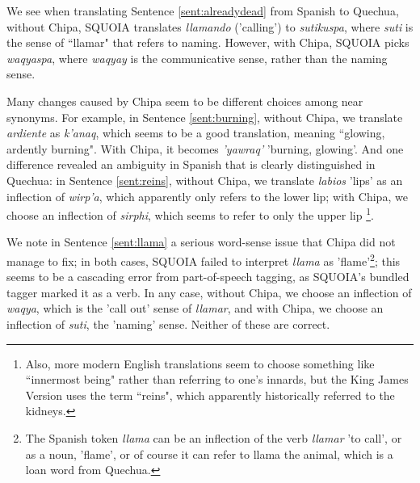 We see when translating Sentence \ref{sent:alreadydead}  from Spanish to
Quechua, without Chipa, SQUOIA translates \emph{llamando} ('calling') to
\emph{sutikuspa}, where \emph{suti} is the sense of ``llamar" that refers to
naming. However, with Chipa, SQUOIA picks \emph{waqyaspa}, where \emph{waqyay}
is the communicative sense, rather than the naming sense.

Many changes caused by Chipa seem to be different choices among near synonyms.
For example, in Sentence \ref{sent:burning}, without Chipa, we translate
\emph{ardiente} as \emph{k'anaq}, which seems to be a good translation, meaning
``glowing, ardently burning". With Chipa, it becomes \emph{'yawraq'} 'burning,
glowing'. And one difference revealed an ambiguity in Spanish that is clearly
distinguished in Quechua: in Sentence \ref{sent:reins}, without Chipa, we
translate \emph{labios} 'lips' as an inflection of \emph{wirp'a}, which
apparently only refers to the lower lip; with Chipa, we choose an inflection of
\emph{sirphi}, which seems to refer to only the upper lip
\footnote{Also, more modern English translations seem to choose something like
``innermost being" rather than referring to one's innards, but the King James
Version uses the term ``reins", which apparently historically referred to the
kidneys.}.

We note in Sentence \ref{sent:llama} a serious word-sense issue that Chipa did
not manage to fix; in both cases, SQUOIA failed to interpret \emph{llama} as
'flame'\footnote{The Spanish token \emph{llama} can be an inflection of the
verb \emph{llamar} 'to call', or as a noun, 'flame', or of course it can refer
to llama the animal, which is a loan word from Quechua.}; this seems to be a
cascading error from part-of-speech tagging, as SQUOIA's bundled tagger marked
it as a verb. In any case, without Chipa, we choose an inflection of
\emph{waqya}, which is the 'call out' sense of \emph{llamar}, and with Chipa,
we choose an inflection of \emph{suti}, the 'naming' sense. Neither of these
are correct.

